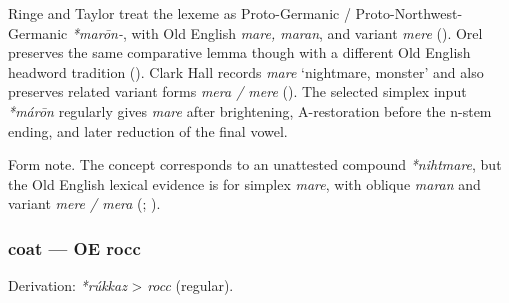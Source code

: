 \documentclass[
  british,
  a4paper,
]{article}
\begin{document}
Ringe and Taylor treat the lexeme as Proto-Germanic /
Proto-Northwest-Germanic \emph{*marōn-}, with Old English \emph{mare,
maran}, and variant \emph{mere} (). Orel preserves the same comparative lemma though
with a different Old English headword tradition
(). Clark Hall records
\emph{mare} `nightmare, monster' and also preserves related variant
forms \emph{mera / mere} (). The selected simplex input \emph{*márōn} regularly gives
\emph{mare} after brightening, A-restoration before the n-stem ending,
and later reduction of the final vowel.

Form note. The concept corresponds to an unattested compound
\emph{*nihtmare}, but the Old English lexical evidence is for simplex
\emph{mare}, with oblique \emph{maran} and variant \emph{mere / mera}
(;
).

\subsubsection{coat --- OE rocc}\label{coat-oe-rocc}

Derivation: \emph{*rúkkaz} \textgreater{} \emph{rocc} (regular).

\begingroup
\setlength{\fboxsep}{6pt}
\end{document}
